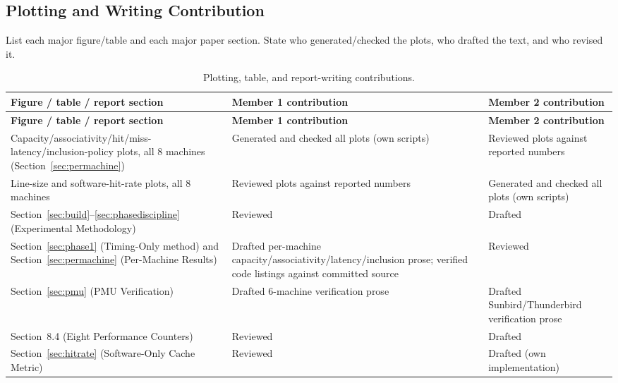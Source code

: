 \documentclass{article}
\begin{document}
\subsection{Plotting and Writing Contribution}

List each major figure/table and each major paper section. State who generated/checked the plots, who drafted the text, and who revised it.

\begin{longtable}{|p{5cm}|p{4.5cm}|p{4.5cm}|}
\caption{Plotting, table, and report-writing contributions.}
\label{tab:plotting-writing-contributions} \\

\hline
\textbf{Figure / table / report section} &
\textbf{Member 1 contribution} &
\textbf{Member 2 contribution} \\
\hline
\endfirsthead

\hline
\textbf{Figure / table / report section} &
\textbf{Member 1 contribution} &
\textbf{Member 2 contribution} \\
\hline
\endhead

Capacity/associativity/hit/miss-latency/inclusion-policy plots, all 8 machines (Section~\ref{sec:permachine}) & Generated and checked all plots (own scripts) & Reviewed plots against reported numbers \\
\hline

Line-size and software-hit-rate plots, all 8 machines & Reviewed plots against reported numbers & Generated and checked all plots (own scripts) \\
\hline

Section~\ref{sec:build}--\ref{sec:phasediscipline} (Experimental Methodology) & Reviewed & Drafted \\
\hline

Section~\ref{sec:phase1} (Timing-Only method) and Section~\ref{sec:permachine} (Per-Machine Results) & Drafted per-machine capacity/associativity/latency/inclusion prose; verified code listings against committed source & Reviewed \\
\hline

Section~\ref{sec:pmu} (PMU Verification) & Drafted 6-machine verification prose & Drafted Sunbird/Thunderbird verification prose \\
\hline

Section~8.4 (Eight Performance Counters) & Reviewed & Drafted \\
\hline

Section~\ref{sec:hitrate} (Software-Only Cache Metric) & Reviewed & Drafted (own implementation) \\
\hline


\end{longtable}
\end{document}
